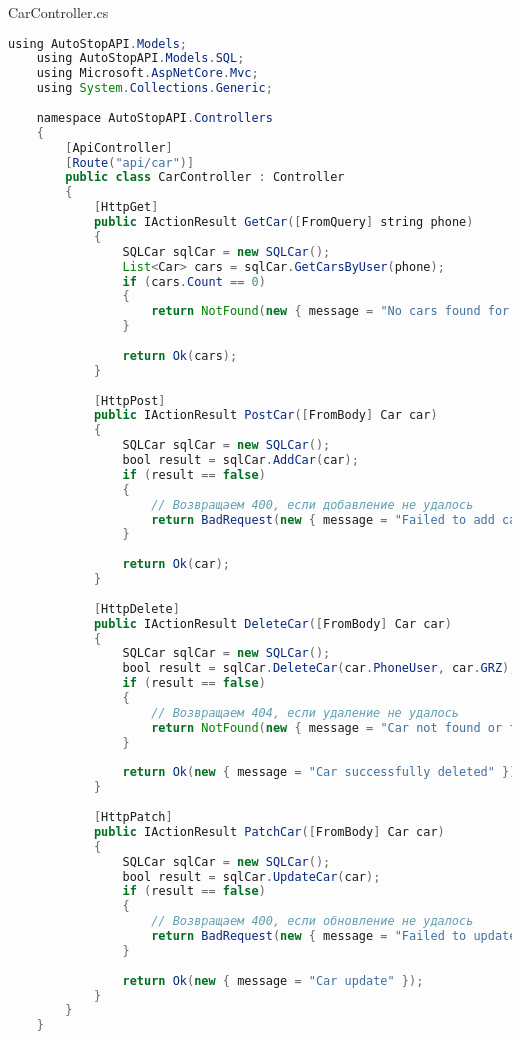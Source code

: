CarController.cs
\begin{lstlisting}[language=Java]
	using AutoStopAPI.Models;
	using AutoStopAPI.Models.SQL;
	using Microsoft.AspNetCore.Mvc;
	using System.Collections.Generic;
	
	namespace AutoStopAPI.Controllers
	{
		[ApiController]
		[Route("api/car")]
		public class CarController : Controller
		{
			[HttpGet]
			public IActionResult GetCar([FromQuery] string phone)
			{
				SQLCar sqlCar = new SQLCar();
				List<Car> cars = sqlCar.GetCarsByUser(phone);
				if (cars.Count == 0)
				{
					return NotFound(new { message = "No cars found for this user" });
				}
				
				return Ok(cars);
			}
			
			[HttpPost]
			public IActionResult PostCar([FromBody] Car car)
			{
				SQLCar sqlCar = new SQLCar();
				bool result = sqlCar.AddCar(car);
				if (result == false)
				{
					// Возвращаем 400, если добавление не удалось
					return BadRequest(new { message = "Failed to add car" });
				}
				
				return Ok(car);
			}
			
			[HttpDelete]
			public IActionResult DeleteCar([FromBody] Car car)
			{
				SQLCar sqlCar = new SQLCar();
				bool result = sqlCar.DeleteCar(car.PhoneUser, car.GRZ);
				if (result == false)
				{
					// Возвращаем 404, если удаление не удалось
					return NotFound(new { message = "Car not found or failed to delete" });
				}
				
				return Ok(new { message = "Car successfully deleted" });
			}
			
			[HttpPatch]
			public IActionResult PatchCar([FromBody] Car car)
			{
				SQLCar sqlCar = new SQLCar();
				bool result = sqlCar.UpdateCar(car);
				if (result == false)
				{
					// Возвращаем 400, если обновление не удалось
					return BadRequest(new { message = "Failed to update car" });
				}
				
				return Ok(new { message = "Car update" });
			}
		}
	}
	
\end{lstlisting}

